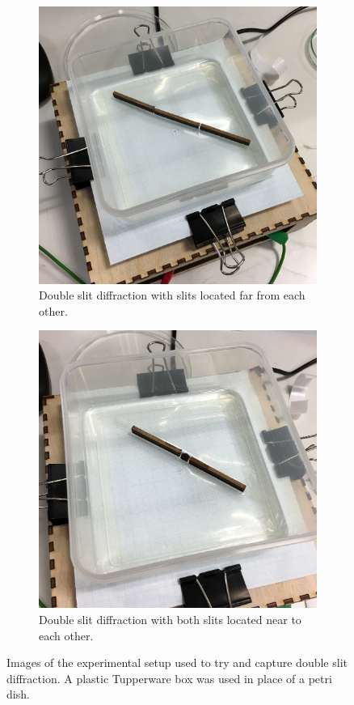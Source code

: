 \begin{figure}[h]
    \centering
    \begin{subfigure}{0.475\textwidth}
        \includegraphics[width=\textwidth]{prototype/exp_rep_imgs/double_slit_setup_1.jpg}
        \caption{Double slit diffraction with slits located far from each other.}
    \end{subfigure}
    \begin{subfigure}{0.475\textwidth}
        \includegraphics[width=\textwidth]{prototype/exp_rep_imgs/double_slit_setup_2.jpg}
        \caption{Double slit diffraction with both slits located near to each other.}
    \end{subfigure}
\caption{Images of the experimental setup used to try and capture double slit diffraction. A plastic Tupperware box was used in place of a petri dish. }
\label{fig:double_slit_setup}
\end{figure}

